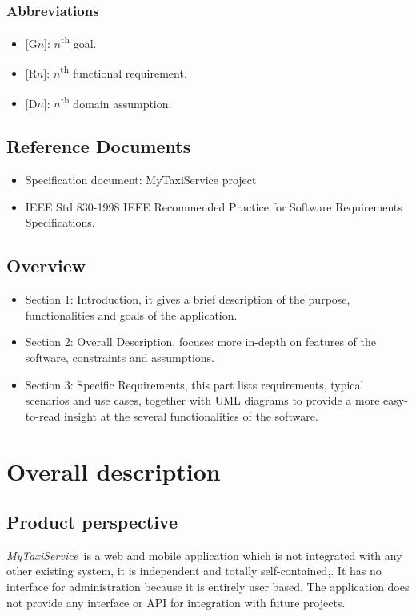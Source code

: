 \documentclass[a4paper,11pt]{report} %
\newcommand{\mts}{\mbox{\normalfont\itshape MyTaxiService\ }}
\begin{document}
		\subsubsection{Abbreviations}
		\begin{itemize}
			\item {[}G$n${]}: $n$\textsuperscript{th} goal.
			\item {[}R$n${]}: $n$\textsuperscript{th} functional requirement.
			\item {[}D$n${]}: $n$\textsuperscript{th} domain assumption.
		\end{itemize}
	
	\subsection{Reference Documents}
		\begin{itemize}
			\item Specification document: MyTaxiService project
			\item IEEE Std 830-1998 IEEE Recommended Practice for Software Requirements	Specifications.
		\end{itemize}
	
	\subsection{Overview}
		\begin{itemize}
			\item Section 1: Introduction, it gives a brief description of the purpose, functionalities and goals of the application.
			\item Section 2: Overall Description, focuses more in-depth on features of the software, constraints and assumptions.
			\item Section 3: Specific Requirements, this part lists requirements, typical scenarios	and use cases, together with UML diagrams to provide a more easy-to-read insight at the several functionalities of the software.
		\end{itemize}
	
	\pagebreak %
	
	\section{Overall description}
	
	\subsection{Product perspective} \mts is a web and mobile application which is not integrated with	any other existing system, it is independent and totally self-contained,. It has no interface for administration because it is entirely user based. The application does not provide any interface or API for integration with future projects.
	
\end{document}
